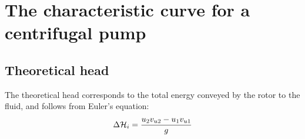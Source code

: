 \section{The characteristic curve for a centrifugal pump}



\subsection{Theoretical head}

The theoretical head corresponds to the total energy conveyed by the
rotor to the fluid, and follows from Euler's equation:
\begin{align*}
  \Delta \mathcal H_i = \frac{u_2 v_{u2} - u_1 v_{u1}}{g}
\end{align*}

